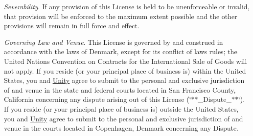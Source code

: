 \begin{DoxyEnumerate}
\item {\itshape Severability}. If any provision of this License is held to be unenforceable or invalid, that provision will be enforced to the maximum extent possible and the other provisions will remain in full force and effect.
\end{DoxyEnumerate}
\begin{DoxyEnumerate}
\item {\itshape Governing Law and Venue}. This License is governed by and construed in accordance with the laws of Denmark, except for its conflict of laws rules; the United Nations Convention on Contracts for the International Sale of Goods will not apply. If you reside (or your principal place of business is) within the United States, you and \mbox{\hyperlink{namespace_unity}{Unity}} agree to submit to the personal and exclusive jurisdiction of and venue in the state and federal courts located in San Francisco County, California concerning any dispute arising out of this License (\char`\"{}$\ast$$\ast$\+\_\+\+Dispute\+\_\+$\ast$$\ast$\char`\"{}). If you reside (or your principal place of business is) outside the United States, you and \mbox{\hyperlink{namespace_unity}{Unity}} agree to submit to the personal and exclusive jurisdiction of and venue in the courts located in Copenhagen, Denmark concerning any Dispute. 
\end{DoxyEnumerate}